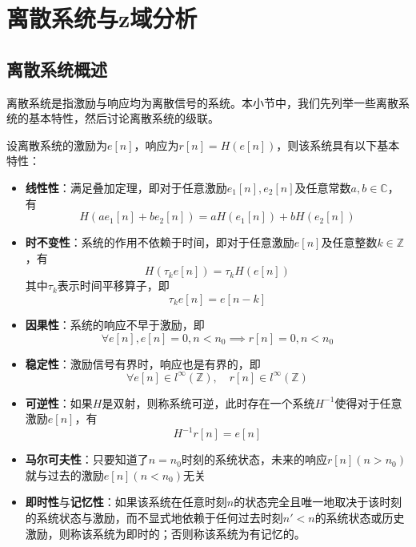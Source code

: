 \section{离散系统与z域分析}\label{sec:Discrete_System_z_Analysis}


\subsection{离散系统概述}\label{sub:discrete_system_overview}

离散系统是指激励与响应均为离散信号的系统。本小节中，我们先列举一些离散系统的基本特性，然后讨论离散系统的级联。

\begin{definition}\label{def:discrete_system}
    设离散系统的激励为$e[n]$，响应为$r[n]=H(e[n])$，则该系统具有以下基本特性：
    \begin{itemize}
        \item \textbf{线性性}：满足叠加定理，即对于任意激励$e_1[n],e_2[n]$及任意常数$a,b\in\mathbb{C}$，有
        \[H(ae_1[n]+be_2[n])=aH(e_1[n])+bH(e_2[n])\]
        \item \textbf{时不变性}：系统的作用不依赖于时间，即对于任意激励$e[n]$及任意整数$k\in\mathbb{Z}$，有
        \[H(\tau_k e[n])=\tau_k H(e[n])\]
        其中$\tau_k$表示时间平移算子，即
        $$\tau_k e[n]=e[n-k]$$
        \item \textbf{因果性}：系统的响应不早于激励，即
        \[\forall e[n],e[n]=0,n<n_0\implies r[n]=0,n<n_0\]
        \item \textbf{稳定性}：激励信号有界时，响应也是有界的，即
        \[\forall e[n]\in l^{\infty}(\mathbb{Z}),\quad r[n]\in l^{\infty}(\mathbb{Z})\]
        \item \textbf{可逆性}：如果$H$是双射，则称系统可逆，此时存在一个系统$H^{-1}$使得对于任意激励$e[n]$，有
        \[H^{-1}r[n]=e[n]\]
        \item \textbf{马尔可夫性}：只要知道了$n=n_0$时刻的系统状态，未来的响应$r[n](n>n_0)$就与过去的激励$e[n](n<n_0)$无关
        \item \textbf{即时性}与\textbf{记忆性}：如果该系统在任意时刻$n$的状态完全且唯一地取决于该时刻的系统状态与激励，而不显式地依赖于任何过去时刻$n'<n$的系统状态或历史激励，则称该系统为即时的；否则称该系统为有记忆的。
    \end{itemize}
\end{definition}

